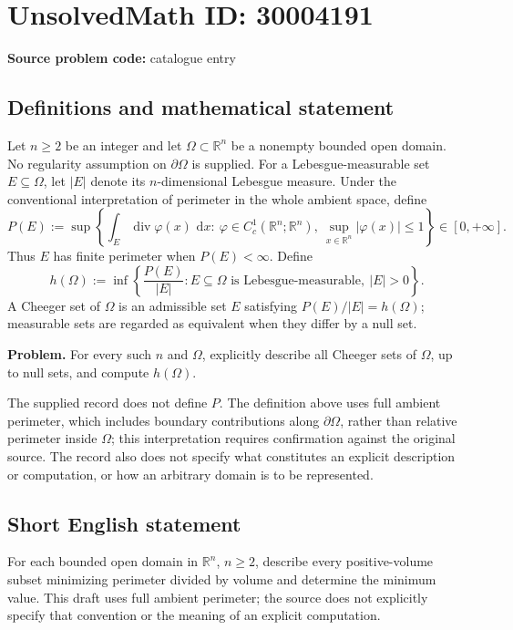\documentclass[11pt]{article}
\newcommand{\R}{\mathbb{R}}
\newcommand{\dd}{\,\mathrm{d}}
\begin{document}
\section*{UnsolvedMath ID: 30004191}
\textbf{Source problem code:} catalogue entry
\subsection{Definitions and mathematical statement}
Let \(n\geq 2\) be an integer and let \(\Omega\subset\R^n\) be a nonempty bounded open domain. No regularity assumption on \(\partial\Omega\) is supplied. For a Lebesgue-measurable set \(E\subseteq\Omega\), let \(|E|\) denote its \(n\)-dimensional Lebesgue measure. Under the conventional interpretation of perimeter in the whole ambient space, define
\[
P(E):=\sup\left\{\int_E\operatorname{div}\varphi(x)\,\dd x:\ \varphi\in C_c^1(\R^n;\R^n),\ \sup_{x\in\R^n}|\varphi(x)|\leq 1\right\}\in[0,+\infty].
\]
Thus \(E\) has finite perimeter when \(P(E)<\infty\). Define
\[
h(\Omega):=\inf\left\{\frac{P(E)}{|E|}:E\subseteq\Omega\text{ is Lebesgue-measurable},\ |E|>0\right\}.
\]
A Cheeger set of \(\Omega\) is an admissible set \(E\) satisfying \(P(E)/|E|=h(\Omega)\); measurable sets are regarded as equivalent when they differ by a null set.

\textbf{Problem.} For every such \(n\) and \(\Omega\), explicitly describe all Cheeger sets of \(\Omega\), up to null sets, and compute \(h(\Omega)\).

The supplied record does not define \(P\). The definition above uses full ambient perimeter, which includes boundary contributions along \(\partial\Omega\), rather than relative perimeter inside \(\Omega\); this interpretation requires confirmation against the original source. The record also does not specify what constitutes an explicit description or computation, or how an arbitrary domain is to be represented.
\subsection{Short English statement}
For each bounded open domain in \(\R^n\), \(n\geq2\), describe every positive-volume subset minimizing perimeter divided by volume and determine the minimum value. This draft uses full ambient perimeter; the source does not explicitly specify that convention or the meaning of an explicit computation.
\end{document}
